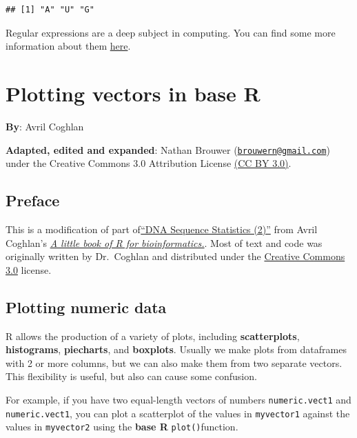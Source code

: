 \documentclass[
]{book}
\begin{document}
\begin{verbatim}
## [1] "A" "U" "G"
\end{verbatim}

Regular expressions are a deep subject in computing. You can find some more information about them \href{https://rstudio-pubs-static.s3.amazonaws.com/74603_76cd14d5983f47408fdf0b323550b846.html}{here}.

\hypertarget{plotting-vectors-in-base-r}{%
\chapter{Plotting vectors in base R}\label{plotting-vectors-in-base-r}}

\textbf{By}: Avril Coghlan

\textbf{Adapted, edited and expanded}: Nathan Brouwer (\href{mailto:brouwern@gmail.com}{\nolinkurl{brouwern@gmail.com}}) under the Creative Commons 3.0 Attribution License \href{https://creativecommons.org/licenses/by/3.0/}{(CC BY 3.0)}.

\hypertarget{preface-5}{%
\section{Preface}\label{preface-5}}

This is a modification of part of\href{https://a-little-book-of-r-for-bioinformatics.readthedocs.io/en/latest/src/chapter2.html}{``DNA Sequence Statistics (2)''} from Avril Coghlan's \href{https://a-little-book-of-r-for-bioinformatics.readthedocs.io/en/latest/index.html}{\emph{A little book of R for bioinformatics.}}. Most of text and code was originally written by Dr.~Coghlan and distributed under the \href{https://creativecommons.org/licenses/by/3.0/us/}{Creative Commons 3.0} license.

\hypertarget{plotting-numeric-data}{%
\section{Plotting numeric data}\label{plotting-numeric-data}}

R allows the production of a variety of plots, including \textbf{scatterplots}, \textbf{histograms}, \textbf{piecharts}, and \textbf{boxplots}. Usually we make plots from dataframes with 2 or more columns, but we can also make them from two separate vectors. This flexibility is useful, but also can cause some confusion.

For example, if you have two equal-length vectors of numbers \texttt{numeric.vect1} and \texttt{numeric.vect1}, you can plot a scatterplot of the values in \texttt{myvector1} against the values in \texttt{myvector2} using the \textbf{base R} \texttt{plot()}function.
\end{document}
